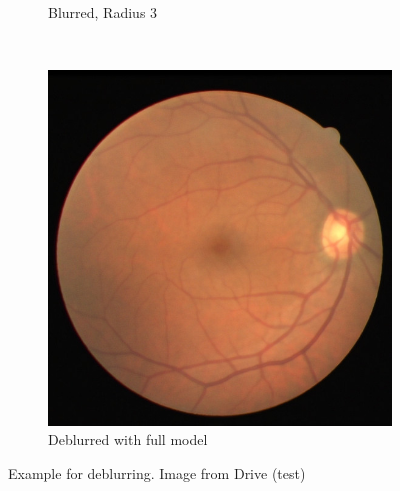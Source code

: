 \documentclass{scrartcl}
\begin{document}
\begin{figure}[htb]
\begin{subfigure}{0.33\textwidth}
    \caption{Blurred, Radius 3}
\end{subfigure}~
\begin{subfigure}{0.33\textwidth}
\centering
    \includegraphics[width=1.0\textwidth]{deblur_gan}
    \caption{Deblurred with full model}
\end{subfigure}

\caption{Example for deblurring. Image from Drive (test)~\cite{Drive}}
\label{fig:deblurring-example}
\end{figure}
\end{document}
